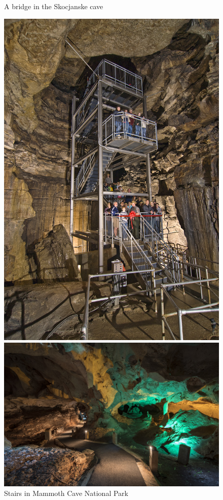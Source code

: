 \documentclass[draft, final]{report}
\begin{document}
\begin{itemize}
\begin{figure}[!ht]
\begin{minipage}[c]{.46\linewidth}
          \caption{A bridge in the Skocjanske cave\cite{bridgeincaves}}
      \end{minipage}
      \hfill%
      \begin{minipage}[c]{.46\linewidth}
          \centering
          \includegraphics[scale=0.45]{LateX/Images/stairsincaves.jpg}
          \caption{Stairs in Mammoth Cave National Park\cite{stairsincaves}}
      \end{minipage}
      \hfill%
      \begin{minipage}[c]{.46\linewidth}
          \centering
          \includegraphics[scale=0.25]{LateX/Images/pathincaves.jpg}

\end{minipage}
\end{figure}
\end{itemize}
\end{document}
